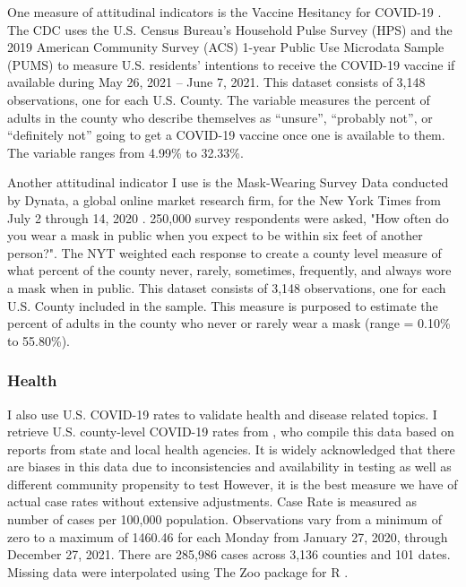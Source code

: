 

One measure of attitudinal indicators is the Vaccine Hesitancy for COVID-19
\citep{vaches_data}. The CDC uses the U.S. Census Bureau’s Household Pulse Survey
(HPS) and the 2019 American Community Survey (ACS) 1-year Public Use Microdata
Sample (PUMS) to measure U.S. residents’ intentions to receive the COVID-19
vaccine if available during May 26, 2021 – June 7, 2021. This dataset consists
of 3,148 observations, one for each U.S. County. The variable
measures the percent of adults in the county who describe themselves as
“unsure”, “probably not”, or “definitely not” going to get a COVID-19 vaccine
once one is available to them. The variable ranges from 4.99\% to 32.33\%. 

Another attitudinal indicator I use is the Mask-Wearing Survey Data conducted by
Dynata, a global online market research firm, for the New York Times from 
July 2 through 14, 2020 \citep{mask_data}. 250,000
survey respondents were asked, "How often do you wear a mask in public when you
expect to be within six feet of another person?". The NYT weighted each response
to create a county level measure of what percent of the county never, rarely,
sometimes, frequently, and always wore a mask when in public. This dataset
consists of 3,148 observations, one for each U.S. County included in the sample. This measure
is purposed to estimate the percent of adults in the county who never or rarely wear a mask
(range = 0.10\% to 55.80\%).

\subsubsection{Health}

I also use U.S. COVID-19 rates to validate health and disease related topics. I
retrieve U.S. county-level COVID-19 rates from \citet{covid_data}, who compile this
data based on reports from state and local health agencies. It is widely
acknowledged that there are biases in this data due to inconsistencies and
availability in testing as well as different community propensity to test
\citep{gu22, cdc20a} However, it is the best measure we have of actual case rates
without extensive adjustments.
Case Rate is measured as number of cases per 100,000 population. Observations
vary from a minimum of zero to a maximum of 1460.46 for each Monday from January 27, 2020, through
December 27, 2021. There are 285,986 cases across 3,136 counties and 101
dates. Missing data were interpolated using The Zoo package for R \citep{zoo}.

